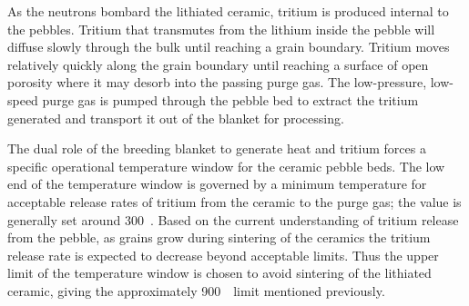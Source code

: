 As the neutrons bombard the lithiated ceramic, tritium is produced internal to the pebbles. Tritium that transmutes from the lithium inside the pebble will diffuse slowly through the bulk until reaching a grain boundary. Tritium moves relatively quickly along the grain boundary until reaching a surface of open porosity where it may desorb into the passing purge gas.\cite{Federici1990} The low-pressure, low-speed purge gas is pumped through the pebble bed to extract the tritium generated and transport it out of the blanket for processing. 

The dual role of the breeding blanket to generate heat and tritium forces a specific operational temperature window for the ceramic pebble beds. The low end of the temperature window is governed by a minimum temperature for acceptable release rates of tritium from the ceramic to the purge gas; the value is generally set around 300~\celsius. Based on the current understanding of tritium release from the pebble, as grains grow during sintering of the ceramics the tritium release rate is expected to decrease beyond acceptable limits. Thus the upper limit of the temperature window is chosen to avoid sintering of the lithiated ceramic, giving the approximately 900~\celsius~limit mentioned previously. 

